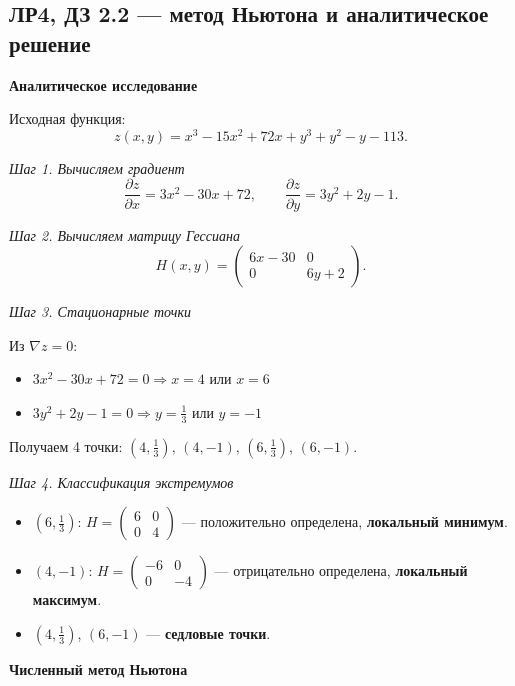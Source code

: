 \documentclass[12pt,a4paper]{article}
\begin{document}
\subsection{ЛР4, ДЗ 2.2 --- метод Ньютона и аналитическое решение}

\textbf{Аналитическое исследование}

Исходная функция:
\[
z(x,y)=x^3 - 15x^2 + 72x + y^3 + y^2 - y - 113.
\]

\textit{Шаг 1. Вычисляем градиент}
\[
\frac{\partial z}{\partial x} = 3x^2 - 30x + 72,
\qquad
\frac{\partial z}{\partial y} = 3y^2 + 2y - 1.
\]

\textit{Шаг 2. Вычисляем матрицу Гессиана}
\[
H(x,y) = \begin{pmatrix} 6x - 30 & 0 \\ 0 & 6y + 2 \end{pmatrix}.
\]

\textit{Шаг 3. Стационарные точки}

Из $\nabla z = 0$:
\begin{itemize}
  \item $3x^2 - 30x + 72 = 0 \Rightarrow x = 4$ или $x = 6$
  \item $3y^2 + 2y - 1 = 0 \Rightarrow y = \frac{1}{3}$ или $y = -1$
\end{itemize}

Получаем 4 точки: $(4, \frac{1}{3})$, $(4, -1)$, $(6, \frac{1}{3})$, $(6, -1)$.

\textit{Шаг 4. Классификация экстремумов}

\begin{itemize}
  \item \textbf{$(6, \frac{1}{3})$}: $H = \begin{pmatrix} 6 & 0 \\ 0 & 4 \end{pmatrix}$ — положительно определена, \textbf{локальный минимум}.

  \item \textbf{$(4, -1)$}: $H = \begin{pmatrix} -6 & 0 \\ 0 & -4 \end{pmatrix}$ — отрицательно определена, \textbf{локальный максимум}.

  \item $(4, \frac{1}{3})$, $(6, -1)$ — \textbf{седловые точки}.
\end{itemize}

\bigskip

\textbf{Численный метод Ньютона}
\end{document}
